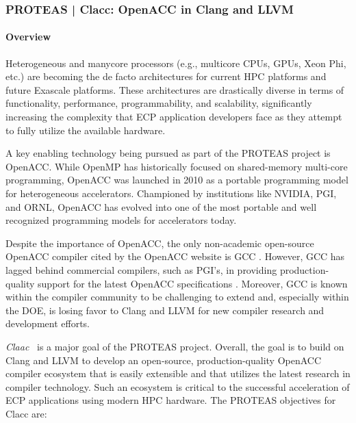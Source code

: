 \subsubsection{ PROTEAS | Clacc: OpenACC in Clang and LLVM}\label{s:clacc}

\newcommand{\todo}[1]{\textbf{\textcolor{red}{#1}}}

\paragraph{Overview}

Heterogeneous and manycore processors (e.g., multicore CPUs, GPUs, Xeon Phi,
etc.) are becoming the de facto architectures for current HPC platforms and
future Exascale platforms.  These architectures are drastically diverse in
terms of functionality, performance, programmability, and scalability,
significantly increasing the complexity that ECP application developers face
as they attempt to fully utilize the available hardware.

A key enabling technology being pursued as part of the PROTEAS project is
OpenACC.  While OpenMP has historically focused on shared-memory multi-core
programming, OpenACC was launched in 2010 as a portable programming model
for heterogeneous accelerators.  Championed by institutions like NVIDIA,
PGI, and ORNL, OpenACC has evolved into one of the most portable and well
recognized programming models for accelerators today.

Despite the importance of OpenACC, the only non-academic open-source OpenACC
compiler cited by the OpenACC website is GCC \cite{openaccOrgTools}.
However, GCC has lagged behind commercial compilers, such as PGI's, in
providing production-quality support for the latest OpenACC specifications
\cite{openACCValidationSuite}.  Moreover, GCC is known within the compiler
community to be challenging to extend and, especially within the DOE, is
losing favor to Clang and LLVM for new compiler research and development
efforts.

\textit{Claac}~\cite{clacc:2018:denny} is a major goal of the PROTEAS project. 
Overall, the goal is to build on Clang and LLVM to develop an
open-source, production-quality OpenACC compiler ecosystem that is easily
extensible and that utilizes the latest research in compiler technology.
Such an ecosystem is critical to the successful acceleration of ECP
applications using modern HPC hardware.  
The PROTEAS objectives for Clacc are:

